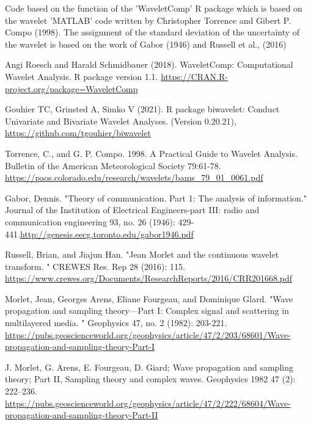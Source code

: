 \documentclass[a4paper]{book}
\begin{document}
%
\begin{Author}
Code based on the  function of the 'WaveletComp' R package
which is based on the wavelet 'MATLAB' code written by Christopher Torrence and Gibert P. Compo (1998).
The assignment of the standard deviation of the uncertainty of the wavelet
is based on the work of Gabor (1946) and Russell et al., (2016)
\end{Author}
%
\begin{References}
Angi Roesch and Harald Schmidbauer (2018). WaveletComp: Computational
Wavelet Analysis. R package version 1.1.
\url{https://CRAN.R-project.org/package=WaveletComp}

Gouhier TC, Grinsted A, Simko V (2021). R package biwavelet: Conduct Univariate and Bivariate Wavelet Analyses. (Version 0.20.21),
\url{https://github.com/tgouhier/biwavelet}

Torrence, C., and G. P. Compo. 1998. A Practical Guide to Wavelet Analysis.
Bulletin of the American Meteorological Society 79:61-78.
\url{https://paos.colorado.edu/research/wavelets/bams_79_01_0061.pdf}

Gabor, Dennis. "Theory of communication. Part 1: The analysis of information."
Journal of the Institution of Electrical Engineers-part III: radio and
communication engineering 93, no. 26 (1946): 429-441.\url{http://genesis.eecg.toronto.edu/gabor1946.pdf}

Russell, Brian, and Jiajun Han. "Jean Morlet and the continuous wavelet transform.
" CREWES Res. Rep 28 (2016): 115. \url{https://www.crewes.org/Documents/ResearchReports/2016/CRR201668.pdf}


Morlet, Jean, Georges Arens, Eliane Fourgeau, and Dominique Glard.
"Wave propagation and sampling theory—Part I: Complex signal and scattering in multilayered media.
" Geophysics 47, no. 2 (1982): 203-221.
\url{https://pubs.geoscienceworld.org/geophysics/article/47/2/203/68601/Wave-propagation-and-sampling-theory-Part-I}

J. Morlet, G. Arens, E. Fourgeau, D. Giard;
Wave propagation and sampling theory; Part II, Sampling theory and complex waves.
Geophysics 1982 47 (2): 222–236. \url{https://pubs.geoscienceworld.org/geophysics/article/47/2/222/68604/Wave-propagation-and-sampling-theory-Part-II}
\end{References}
%
\end{document}
